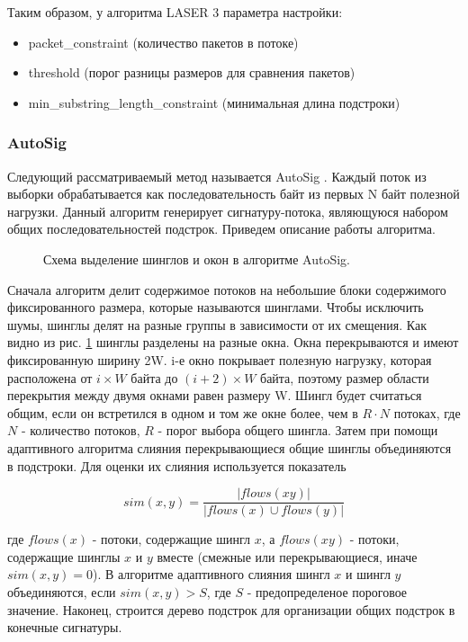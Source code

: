 Таким образом, у алгоритма LASER 3 параметра настройки:
\begin{itemize}
    \item packet\_constraint (количество пакетов в потоке)
    \item threshold (порог разницы размеров для сравнения пакетов)
    \item min\_substring\_length\_constraint (минимальная длина подстроки)
\end{itemize}

\subsubsection{AutoSig}

Следующий рассматриваемый метод называется AutoSig \cite{ye2009autosig, santosautomatic}.
Каждый поток из выборки обрабатывается как последовательность байт из первых N байт полезной нагрузки.
Данный алгоритм генерирует сигнатуру-потока, являющуюся набором общих последовательностей подстрок.
Приведем описание работы алгоритма.

\begin{figure}[h!]
    \begin{center}
        
        \caption{Схема выделение шинглов и окон в алгоритме AutoSig.}\label{autosig:shingles}
    \end{center}
\end{figure}

Сначала алгоритм делит содержимое потоков на небольшие блоки содержимого фиксированного размера, которые называются шинглами.
Чтобы исключить шумы, шинглы делят на разные группы в зависимости от их смещения. Как видно из рис. \ref{autosig:shingles} шинглы разделены на разные окна.
Окна перекрываются и имеют фиксированную ширину 2W. i-е окно покрывает полезную нагрузку, которая расположена от $i \times W$ байта до $(i+2) \times W$ байта,
поэтому размер области перекрытия между двумя окнами равен размеру W. Шингл будет считаться общим, если он встретился в одном и том же окне более, чем в $R \cdot N$ потоках,
где $N$ - количество потоков, $R$ - порог выбора общего шингла. Затем при помощи адаптивного алгоритма слияния перекрывающиеся общие шинглы объединяются в подстроки.
Для оценки их слияния используется показатель

$$ sim(x, y) = \frac{|flows(xy)|}{|flows(x) \cup flows(y)|} $$

где $flows(x)$ - потоки, содержащие шингл $x$, а $flows(xy)$ - потоки, содержащие шинглы $x$ и $y$ вместе (смежные или перекрывающиеся, иначе $sim(x, y) = 0$).
В алгоритме адаптивного слияния шингл $x$ и шингл $y$ объединяются, если $sim(x, y)>S$, где $S$ - предопределеное пороговое значение.
Наконец, строится дерево подстрок для организации общих подстрок в конечные сигнатуры.

